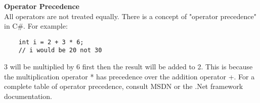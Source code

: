 \textbf{Operator Precedence}\\
All operators are not treated equally. There is a concept of "operator precedence" in C\#. For example:

\begin{lstlisting}
    int i = 2 + 3 * 6;
    // i would be 20 not 30        
\end{lstlisting}
3 will be multiplied by 6 first then the result will be added to 2. This is because the multiplication operator * has
precedence over the addition operator +. For a complete table of operator precedence, consult MSDN or the .Net
framework documentation.